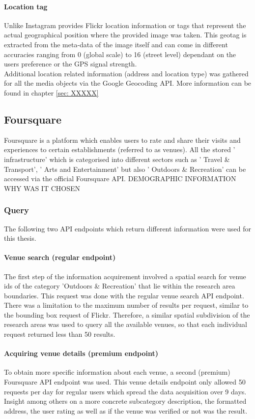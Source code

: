 \paragraph{Location tag}
Unlike Instagram provides Flickr location information or tags that represent the actual geographical position where the provided image was taken. This geotag is extracted from the meta-data of the image itself and can come in different accuracies ranging from 0 (global scale) to 16 (street level) dependant on the users preference or the GPS signal strength. \\
Additional location related information (address and location type) was gathered for all the media objects via the Google Geocoding API. More information can be found in chapter \ref{sec: XXXXX}

\subsection{Foursquare} \label{foursquare}
Foursquare is a platform which enables users to rate and share their visits and experiences to certain establishments (referred to as venues). All the stored ' infrastructure' which is categorised into different sectors such as ' Travel \& Transport', ' Arts and Entertainment' but also ' Outdoors \& Recreation' can be accessed via the official Foursquare API.
DEMOGRAPHIC INFORMATION
WHY WAS IT CHOSEN
\subsubsection{Query} \label{foursquare_query}
The following two API endpoints which return different information were used for this thesis.
\paragraph{Venue search (regular endpoint)} \label{foursquare_endpoint1}
The first step of the information acquirement involved a spatial search for venue ids of the category 'Outdoors \& Recreation' that lie within the research area boundaries. This request was done with the regular venue search API endpoint. There was a limitation to the maximum number of results per request, similar to the bounding box request of Flickr. Therefore, a similar spatial subdivision of the research areas was used to query all the available venues, so that each individual request returned less than 50 results.
\paragraph{Acquiring venue details (premium endpoint)} \label{foursquare_endpoint2}
To obtain more specific information about each venue, a second (premium) Foursquare API endpoint was used. This venue details endpoint only allowed 50 requests per day for regular users which spread the data acquisition over 9 days. Insight among others on a more concrete subcategory description, the formatted address, the user rating as well as if the venue was verified or not was the result.


